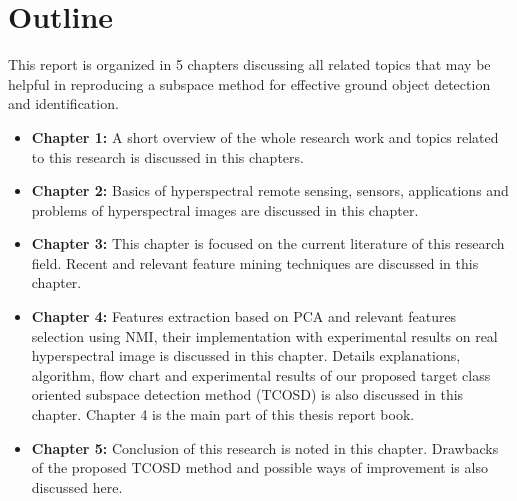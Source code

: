 \documentclass[document.tex]{subfiles}
\begin{document}
\section{Outline}
\noindent This report is organized in 5 chapters discussing all related topics that may be helpful in reproducing a subspace method for effective ground object detection and identification.
\begin{itemize}	
\item \textbf{Chapter 1:} A short overview of the whole research work and topics related to this research is discussed in this chapters.
\item \textbf{Chapter 2:} Basics of hyperspectral remote sensing, sensors, applications and problems of hyperspectral images are discussed in this chapter. 
\item \textbf{Chapter 3:} This chapter is focused on the current literature of this research field. Recent and relevant feature mining techniques are discussed in this chapter.
\item \textbf{Chapter 4:} Features extraction based on PCA and relevant features selection using NMI, their implementation with experimental results on real hyperspectral image is discussed in this chapter. Details explanations, algorithm, flow chart and experimental results of our proposed target class oriented subspace detection method (TCOSD) is also discussed in this chapter. Chapter 4 is the main part of this thesis report book.
\item \textbf{Chapter 5:} Conclusion of this research is noted in this chapter. Drawbacks of the proposed TCOSD method and possible ways of improvement is also discussed here.
\end{itemize}
\end{document}
